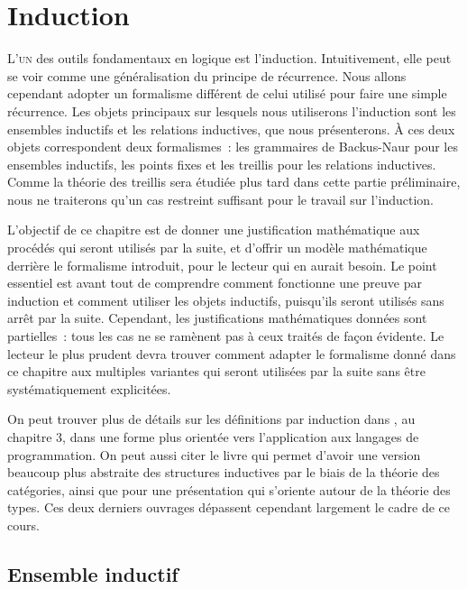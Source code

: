 \chapter{Induction}
\label{chp.induction}

\minitoc

\lettrine{L}{'un} des outils fondamentaux en logique est l'induction.
Intuitivement, elle peut se voir comme une généralisation du principe de
récurrence. Nous allons cependant adopter un formalisme différent de celui
utilisé pour faire une simple récurrence. Les objets principaux sur lesquels
nous utiliserons l'induction sont les ensembles inductifs et les relations
inductives, que nous présenterons. \`A ces deux objets correspondent deux
formalismes~: les grammaires de Backus-Naur pour les ensembles inductifs, les
points fixes et les treillis pour les relations inductives.
Comme la théorie des treillis sera étudiée plus tard dans cette partie
préliminaire, nous ne traiterons qu'un cas restreint suffisant pour le travail
sur l'induction.

L'objectif de ce chapitre est de donner une justification mathématique aux
procédés qui seront utilisés par la suite, et d'offrir un modèle mathématique
derrière le formalisme introduit, pour le lecteur qui en aurait besoin. Le point
essentiel est avant tout de comprendre comment fonctionne une preuve par
induction et comment utiliser les objets inductifs, puisqu'ils seront utilisés
sans arrêt par la suite. Cependant, les justifications mathématiques données
sont partielles~: tous les cas ne se ramènent pas à ceux traités de façon
évidente. Le lecteur le plus prudent devra trouver comment adapter le formalisme
donné dans ce chapitre aux multiples variantes qui seront utilisées par la
suite sans être systématiquement explicitées.

On peut trouver plus de détails sur les définitions par induction dans
\cite{Winskel1993}, au chapitre $3$, dans une forme plus orientée vers
l'application aux langages de programmation. On peut aussi citer le livre
\cite{Jacobs1999} qui permet d'avoir une version beaucoup plus abstraite des
structures inductives par le biais de la théorie des catégories, ainsi que
\cite{UnivalentFoundationsProgram2013} pour une présentation qui s'oriente
autour de la théorie des types. Ces deux derniers ouvrages dépassent cependant
largement le cadre de ce cours.

\section{Ensemble inductif}

